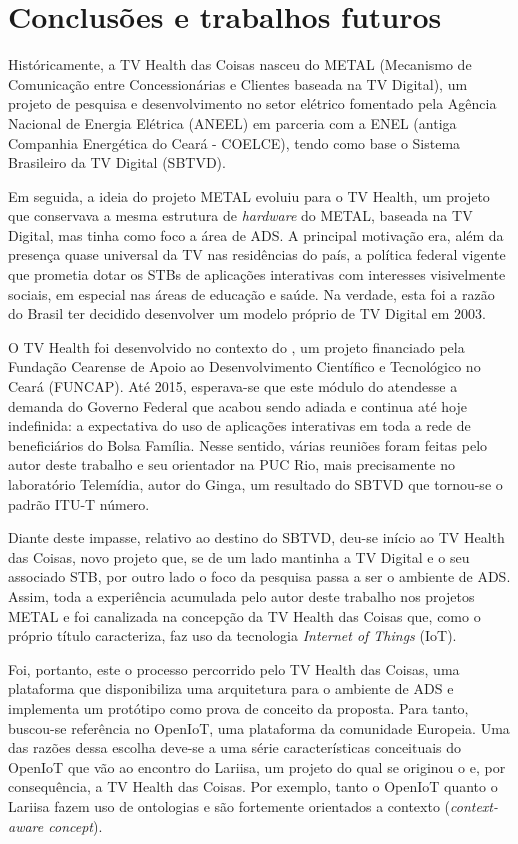 \chapter{Conclusões e trabalhos futuros} \label{cap:conclusao}

Históricamente, a TV Health das Coisas nasceu do METAL (Mecanismo de Comunicação entre Concessionárias e Clientes baseada na TV Digital), um projeto de pesquisa e 
desenvolvimento no setor elétrico fomentado pela Agência Nacional de
Energia Elétrica (ANEEL) em parceria com a ENEL (antiga Companhia Energética do
Ceará - COELCE), tendo como base o Sistema Brasileiro da TV Digital (SBTVD). 

Em seguida, a ideia do projeto METAL evoluiu para o TV Health, um projeto que
conservava a mesma estrutura de \textit{hardware} do METAL, baseada na TV Digital,
mas tinha como foco a área de ADS. A principal motivação era, além da presença
quase universal da TV nas residências do país, a política federal vigente que prometia
dotar os STBs de aplicações interativas com interesses visivelmente sociais,
em especial nas áreas de educação e saúde. Na verdade, esta foi a razão do Brasil
ter decidido desenvolver um modelo próprio de TV Digital em 2003.

O TV Health foi desenvolvido no contexto do \nextsaude, um projeto financiado
pela Fundação Cearense de Apoio ao Desenvolvimento Científico e Tecnológico
no Ceará (FUNCAP). Até 2015, esperava-se que este módulo do \nextsaude
atendesse a demanda do Governo Federal que acabou sendo adiada e continua até
hoje indefinida: a expectativa do uso de aplicações interativas em toda a rede
de beneficiários do Bolsa Família. Nesse sentido, várias reuniões foram feitas
pelo autor deste trabalho e seu orientador na PUC Rio, mais precisamente no
laboratório Telemídia, autor do \middleware[] Ginga, um resultado do SBTVD que
tornou-se o padrão ITU-T número.

Diante deste impasse, relativo ao destino do SBTVD, deu-se início ao TV Health
das Coisas, novo projeto que, se de um lado mantinha a TV Digital e o seu associado
STB, por outro lado o foco da pesquisa passa a ser o ambiente de ADS. Assim,
toda a experiência acumulada pelo autor deste trabalho nos projetos METAL e
\nextsaude foi canalizada na concepção da TV Health das Coisas que, como o próprio
título caracteriza, faz uso da tecnologia \textit{Internet of Things} (IoT).

Foi, portanto, este o processo percorrido pelo TV Health das Coisas, uma plataforma
que disponibiliza uma arquitetura para o ambiente de ADS e implementa um protótipo 
como prova de conceito da proposta. Para tanto, buscou-se referência no OpenIoT,
uma plataforma da comunidade Europeia. Uma das razões dessa escolha deve-se a
uma série características conceituais do OpenIoT que vão ao encontro do Lariisa,
um projeto do qual se originou o \nextsaude e, por consequência, a TV Health
das Coisas. Por exemplo, tanto o OpenIoT quanto o Lariisa fazem uso de ontologias
e são fortemente orientados a contexto (\textit{context-aware concept}). 

